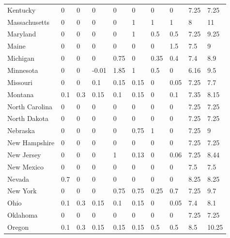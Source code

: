 \begin{table}[H]
{{\begin{tabular}{@{}llllllllll@{}}
            Kentucky       & 0    & 0    & 0     & 0    & 0    & 0    & 0    & 7.25     & 7.25   \\
            Massachusetts & 0    & 0    & 0     & 0    & 1    & 1    & 1    & 8        & 11     \\
            Maryland       & 0    & 0    & 0     & 0    & 1    & 0.5  & 0.5  & 7.25     & 9.25   \\
            Maine          & 0    & 0    & 0     & 0    & 0    & 0    & 1.5  & 7.5      & 9      \\
            Michigan       & 0    & 0    & 0     & 0.75 & 0    & 0.35 & 0.4  & 7.4      & 8.9    \\
            Minnesota      & 0    & 0    & -0.01 & 1.85 & 1    & 0.5  & 0    & 6.16     & 9.5    \\
            Missouri       & 0    & 0    & 0.1   & 0.15 & 0.15 & 0    & 0.05 & 7.25     & 7.7    \\
            Montana        & 0.1  & 0.3  & 0.15  & 0.1  & 0.15 & 0    & 0.1  & 7.35     & 8.15   \\
            North Carolina & 0    & 0    & 0     & 0    & 0    & 0    & 0    & 7.25     & 7.25   \\
            North Dakota   & 0    & 0    & 0     & 0    & 0    & 0    & 0    & 7.25     & 7.25   \\
            Nebraska       & 0    & 0    & 0     & 0    & 0.75 & 1    & 0    & 7.25     & 9      \\
            New Hampshire  & 0    & 0    & 0     & 0    & 0    & 0    & 0    & 7.25     & 7.25   \\
            New Jersey     & 0    & 0    & 0     & 1    & 0.13 & 0    & 0.06 & 7.25     & 8.44   \\
            New Mexico     & 0    & 0    & 0     & 0    & 0    & 0    & 0    & 7.5      & 7.5    \\
            Nevada         & 0.7  & 0    & 0     & 0    & 0    & 0    & 0    & 8.25     & 8.25   \\
            New York       & 0    & 0    & 0     & 0.75 & 0.75 & 0.25 & 0.7  & 7.25     & 9.7    \\
            Ohio           & 0.1  & 0.3  & 0.15  & 0.1  & 0.15 & 0    & 0.05 & 7.4      & 8.1    \\
            Oklahoma       & 0    & 0    & 0     & 0    & 0    & 0    & 0    & 7.25     & 7.25   \\
            Oregon         & 0.1  & 0.3  & 0.15  & 0.15 & 0.15 & 0.5  & 0.5  & 8.5      & 10.25  \\

\end{tabular}}}
\end{table}
